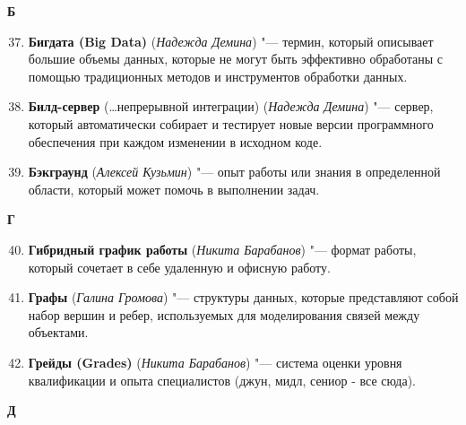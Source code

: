 \begin{flushleft} \large\textbf{Б} \end{flushleft}

\begin{enumerate}
    \setcounter{enumi}{36}

    \item \textbf{Бигдата (Big Data)} (\textit{Надежда Демина}) "--- 
    термин, который описывает большие объемы данных, которые не могут быть эффективно обработаны с помощью традиционных методов и инструментов обработки данных.

    \item \textbf{Билд-сервер} (…непрерывной интеграции) (\textit{Надежда Демина}) "--- 
    сервер, который автоматически собирает и тестирует новые версии программного обеспечения при каждом изменении в исходном коде. 

    \item \textbf{Бэкграунд} (\textit{Алексей Кузьмин}) "--- 
    опыт работы или знания в определенной области, который может помочь в выполнении задач. 
\end{enumerate}

\begin{flushleft} \large\textbf{Г} \end{flushleft}

\begin{enumerate}
    \setcounter{enumi}{39}

    \item \textbf{Гибридный график работы} (\textit{Никита Барабанов}) "--- 
    формат работы, который сочетает в себе удаленную и офисную работу.

    \item \textbf{Графы} (\textit{Галина Громова}) "--- 
    структуры данных, которые представляют собой набор вершин и ребер, используемых для моделирования связей между объектами.

    \item \textbf{Грейды (Grades)} (\textit{Никита Барабанов}) "--- 
    система оценки уровня квалификации и опыта специалистов (джун, мидл, сениор - все сюда). 
\end{enumerate}

\begin{flushleft} \large\textbf{Д} \end{flushleft}

